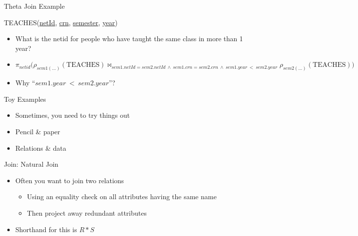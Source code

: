 \documentclass[aspectratio=169]{beamer}
\newenvironment{noindentitemize}
{ \begin{itemize}
 \setlength{\itemsep}{1.5ex}
  \setlength{\parsep}{0pt}   
  \setlength{\parskip}{0pt}
 \addtolength{\leftskip}{-2em}
 }
{ \end{itemize} }
\newenvironment{noindentitemize2}
{ \begin{itemize}
  \setlength{\itemsep}{0ex}
  \setlength{\parskip}{0pt}
  \setlength{\parsep}{0pt}   
  \addtolength{\leftskip}{-2em}  }
{ \end{itemize} }
\newcommand{\TEACHES}{\textrm{TEACHES}}
\begin{document}

\begin{frame}{Theta Join Example}

TEACHES(\underline{netId}, \underline{crn}, \underline{semester}, \underline{year})

\begin{noindentitemize}
\item What is the netid for people who have taught the same class in more than 1 year?
\item $\pi_{netid}\Big(\rho_{sem1(\ldots)}(\TEACHES) \bowtie_{sem1.netId = sem2.netId\ \wedge\ sem1.crn = sem2.crn\ \wedge\ sem1.year\ <\ sem2.year} \rho_{sem2(\ldots)}(\TEACHES)\Big)$
\item Why ``$sem1.year\ <\ sem2.year$''?
\end{noindentitemize}

\end{frame}

\begin{frame}{Toy Examples}


\begin{noindentitemize}
\item Sometimes, you need to try things out
\item Pencil \& paper
\item Relations \& data
\end{noindentitemize}

\end{frame}


\begin{frame}{Join: Natural Join}
\begin{noindentitemize}
\item Often you want to join two relations
	\begin{noindentitemize2}
	\item Using an equality check on all attributes having the same name
	\item Then project away redundant attributes
	\end{noindentitemize2}
\item Shorthand for this is $R * S$
\end{noindentitemize}

\end{frame}
\end{document}
